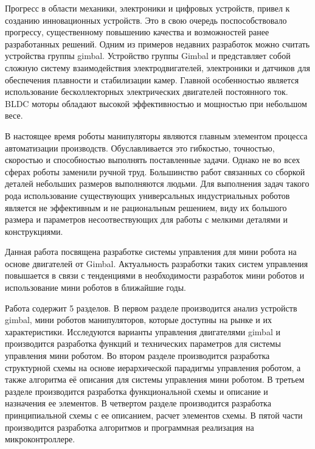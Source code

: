 Прогресс в области механики, электроники и цифровых устройств, привел к созданию инновационных устройств. Это в свою очередь поспособствовало прогрессу, существенному повышению качества и возможностей ранее разработанных решений. Одним из примеров недавних разработок можно считать устройства группы gimbal. Устройство группы Gimbal и представляет собой сложную систему взаимодействия электродвигателей, электроники и датчиков для обеспечения плавности и стабилизации камер. Главной особенностью является использование бесколлекторных электрических двигателей постоянного ток. BLDC моторы обладают высокой эффективностью и мощностью при небольшом весе. 

В настоящее время роботы манипуляторы являются главным элементом процесса автоматизации производств. Обуславливается это гибкостью, точностью, скоростью и способностью выполнять поставленные задачи. Однако не во всех сферах роботы заменили ручной труд. Большинство работ связанных со сборкой деталей небольших размеров выполняются людьми. Для выполнения задач такого рода использование существующих универсальных индустриальных роботов является не эффективным и не рациональным решением, виду их большого размера и параметров несоотвествующих для работы с мелкими деталями и конструкциями.

Данная работа посвящена разработке системы управления для мини робота на основе двигателей от Gimbal. Актуальность разработки таких систем управления повышается в связи с тенденциями в необходимости разработок мини роботов и использование мини роботов в ближайшие годы.

Работа содержит 5 разделов. В первом разделе производится анализ устройств gimbal, мини роботов манипуляторов, которые доступны на рынке и их характеристики. Исследуются варианты управления двигателями gimbal и производится разработка функций и технических параметров для системы управления мини роботом.  Во втором разделе производится разработка структурной схемы на основе иерархической парадигмы управления роботом, а также алгоритма её описания для системы управления мини роботом. В третьем разделе производится разработка функциональной схемы и описание и назначения ее элементов. В четвертом разделе производится разработка принципиальной схемы с ее описанием, расчет элементов схемы. В пятой части производится разработка алгоритмов и программная реализация на микроконтроллере. 
